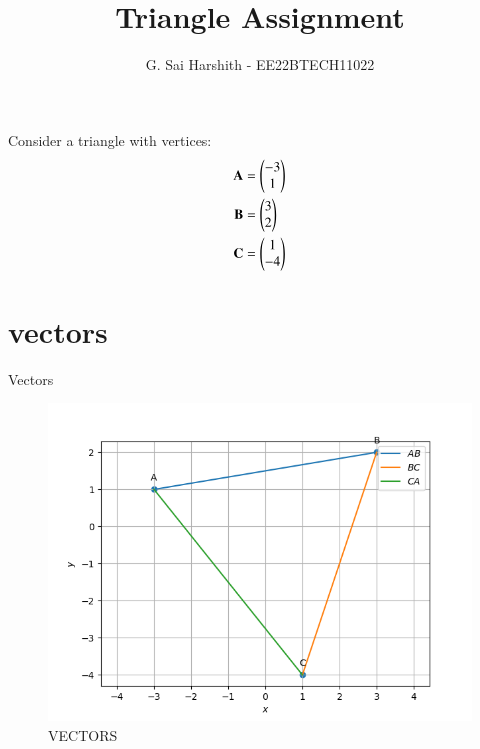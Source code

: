 \documentclass[journal,12pt,onecolumn]{IEEEtran}
\theoremstyle{remark}
\begin{document}


\vspace{3cm}
\title{
Triangle Assignment
}
\author{G. Sai Harshith - EE22BTECH11022	
}

\maketitle
\bigskip
\renewcommand{\thefigure}{\theenumi}
\renewcommand{\thetable}{\theenumi}
Consider a triangle with vertices:
\begin{align}
\mathbf{A} &= \begin{pmatrix}-3\\1\end{pmatrix}\\
\mathbf{B} &= \begin{pmatrix}3\\2\end{pmatrix}\\
\mathbf{C} &= \begin{pmatrix}1\\-4\end{pmatrix}
\end{align}
\begin{table}[!ht]
	\section{vectors}
	\centering
	
	\caption{Vectors}
	\label{table:vectors}
\end{table}
\begin{figure}
\includegraphics[width=\columnwidth]{figs/Q1.1.3.png}
\caption{VECTORS}
\label{fig:vectors}
\end{figure}
\end{document}
